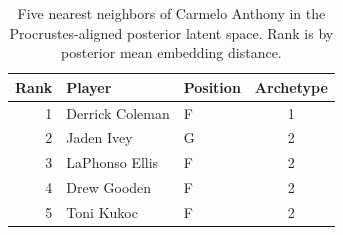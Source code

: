 \begin{table}[htbp]
  \centering\small
  \begin{tabular}{rllc}
    \toprule
    Rank & Player & Position & Archetype \\
    \midrule
    1 & Derrick Coleman & F & 1 \\
    2 & Jaden Ivey & G & 2 \\
    3 & LaPhonso Ellis & F & 2 \\
    4 & Drew Gooden & F & 2 \\
    5 & Toni Kukoc & F & 2 \\
    \bottomrule
  \end{tabular}
  \caption{Five nearest neighbors of Carmelo Anthony in the Procrustes-aligned posterior latent space. Rank is by posterior mean embedding distance.}
  \label{tab:Carmelo_Anthony_neighbors}
\end{table}

